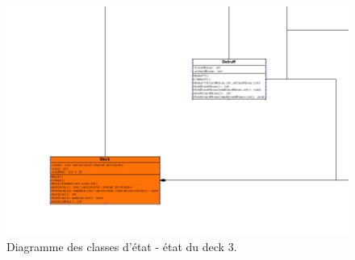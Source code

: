 \begin{landscape}
\begin{figure}[p]
\includegraphics[width=0.8\paperheight]{images/state7.png}
\caption{\label{uml:state}Diagramme des classes d'état - état du deck 3.} 
\end{figure}
\end{landscape}


\clearpage